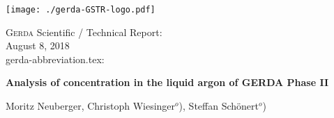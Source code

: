\documentclass[encoding=utf8,british]{tumphthesis}
\newcommand{\repdate}    {August 8, 2018} %
\newcommand{\titleheader}{Analysis of \Kr concentration in the liquid argon of GERDA Phase II} %
\begin{document}
\begin{titlepage}
\parbox[b]{40mm}{
\ifmakefigures%
  \vspace*{-7truecm}
  \texttt{[image: ./gerda-GSTR-logo.pdf]}
\fi%
  }
\parbox[b]{110mm}{\hfill\hfill
\textsc{Gerda} Scientific / Technical Report:~~ \textbf{\repnumber}\\[12mm]
 \hspace*{30mm}\hfill\hfill\repdate\\
 \hspace*{1mm}\hfill\small gerda-abbreviation.tex:~\versionabb}

\vspace*{20mm}
\begin{center}
{\Large\textbf{\titleheader}}
\vspace*{10mm}

Moritz Neuberger, Christoph Wiesinger$^o$), Steffan Schönert$^o$)
\vspace*{5mm}


\end{center}
\end{titlepage}
\end{document}
